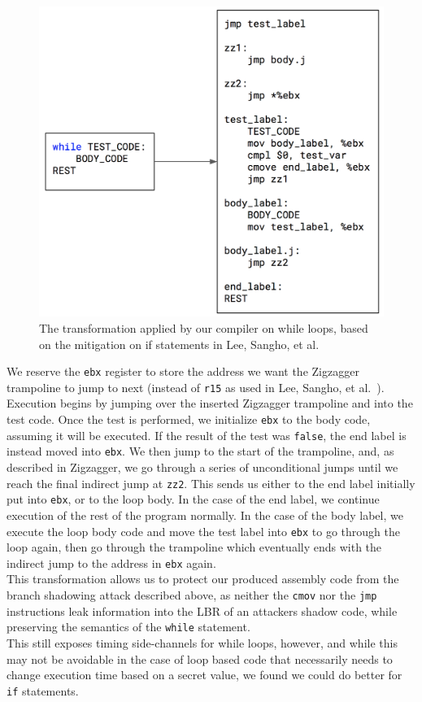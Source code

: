 \documentclass[sigplan, review]{acmart}
\begin{document}
\begin{figure}[bhp]
\includegraphics[width=\columnwidth]{./while_zigzagger.png}
\caption{The transformation applied by our compiler on while loops, based on the mitigation on if statements in Lee, Sangho, et al.}
\label{fig:while_zigzagger}
\end{figure}

We reserve the \texttt{ebx} register to store the address we want the Zigzagger trampoline to jump to next (instead of \texttt{r15} as used in Lee, Sangho, et al.~\cite{lee2016inferring}). Execution begins by jumping over the inserted Zigzagger trampoline and into the test code. Once the test is performed, we initialize \texttt{ebx} to the body code, assuming it will be executed. If the result of the test was \texttt{false}, the end label is instead moved into \texttt{ebx}. We then jump to the start of the trampoline, and, as described in Zigzagger, we go through a series of unconditional jumps until we reach the final indirect jump at \texttt{zz2}. This sends us either to the end label initially put into \texttt{ebx}, or to the loop body. In the case of the end label, we continue execution of the rest of the program normally. In the case of the body label, we execute the loop body code and move the test label into \texttt{ebx} to go through the loop again, then go through the trampoline which eventually ends with the indirect jump to the address in \texttt{ebx} again.\\
This transformation allows us to protect our produced assembly code from the branch shadowing attack described above, as neither the \texttt{cmov} nor the \texttt{jmp} instructions leak information into the LBR of an attackers shadow code, while preserving the semantics of the \texttt{while} statement.\\
This still exposes timing side-channels for while loops, however, and while this may not be avoidable in the case of loop based code that necessarily needs to change execution time based on a secret value, we found we could do better for \texttt{if} statements.
\end{document}
